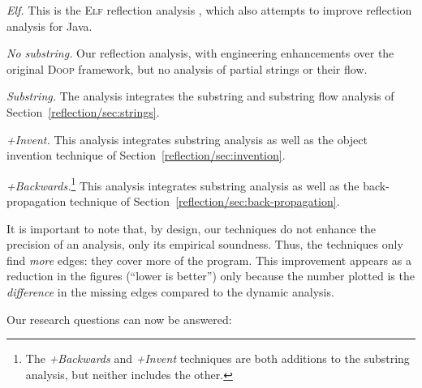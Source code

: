 \begin{asparaenum}
\item \emph{Elf.} This is the \textsc{Elf} reflection analysis
  \cite{ecoop/LiTSX14}, which also attempts to improve reflection
  analysis for Java. 
\item \emph{No substring.} Our reflection analysis, with 
  engineering enhancements over the original \textsc{Doop} framework,
  but no analysis of partial strings or their flow.
\item \emph{Substring.} The analysis integrates the substring and
  substring flow analysis of Section~\ref{reflection/sec:strings}.
\item \emph{+Invent.} This analysis integrates substring analysis as well as the
  object invention technique of Section~\ref{reflection/sec:invention}.
\item \emph{+Backwards.}\footnote{The \emph{+Backwards} and
    \emph{+Invent} techniques %
    are both additions to the substring analysis, but neither includes
    the other.} This analysis integrates substring analysis as well as
  the back-propagation technique of
  Section~\ref{reflection/sec:back-propagation}.
\end{asparaenum}


It is important to note that, by design, our techniques
do not enhance the precision of an analysis, only its empirical
soundness.  Thus, the techniques
only find \emph{more} edges: they cover more of the
program. This improvement appears as a reduction in the figures
(``lower is better'') only because the number plotted is the
\emph{difference} in the missing edges compared to the dynamic
analysis.

Our research questions can now be answered:

